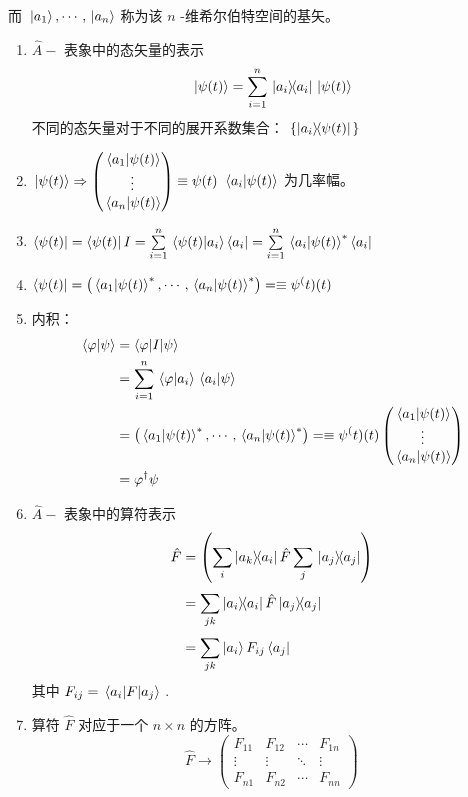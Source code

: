 而 \( \ket*{a_1},\cdots,\ket*{a_n} \) 称为该 \( n \) -维希尔伯特空间的基矢。
\begin{enumerate}
    \item  \( \hat{A}- \) 表象中的态矢量的表示 \[
        \ket*{\psi(t)}=\sum\limits_{i=1}^{n}\ketbra*{a_i}{a_i}\ket*{\psi(t)}
    \] 不同的态矢量对于不同的展开系数集合： \( \left.\{ \ketbra{a_i}{\psi(t)} \right.\} \) 
    \item  \( \ket*{\psi(t)}\Rightarrow\begin{pmatrix}
        \braket*{a_1}{\psi(t)}\\ 
        \vdots \\ 
        \braket*{a_n}{\psi(t)}
    \end{pmatrix}\equiv\psi(t) \)  \( \braket*{a_i}{\psi(t)} \) 为几率幅。
    \item  \( \bra{\psi(t)}=\bra{\psi(t)}I=\sum\limits_{i=1}^{n}\braket*{\psi(t)}{a_i}\bra{a_i}=\sum\limits_{i=1}^{n}\braket*{a_i}{\psi(t)}^*\bra{a_i} \) 
    \item  \( \bra{\psi(t)}=\qty(\braket*{a_1}{\psi(t)}^*,\cdots,\braket*{a_n}{\psi(t)}^*)=\equiv\psi^(t)(t) \) 
    \item 内积： \[\begin{aligned}
        \braket*{\varphi}{\psi}&=\mel**{\varphi}{I}{\psi}\\ 
        &=\sum\limits_{i=1}^{n}\braket*{\varphi}{a_i}\braket*{a_i}{\psi }\\ 
        &= \qty(\braket*{a_1}{\psi(t)}^*,\cdots,\braket*{a_n}{\psi(t)}^*)=\equiv\psi^(t)(t)  \begin{pmatrix}
            \braket*{a_1}{\psi(t)}\\ 
            \vdots \\ 
            \braket*{a_n}{\psi(t)}
        \end{pmatrix}\\ 
        &=\varphi^\dagger\psi 
    \end{aligned}
    \]
    \item  \( \hat{A}- \) 表象中的算符表示 \[
        \begin{aligned}
            \hat{F}&=\qty(\sum\limits_{i}^{}\ketbra{a_k}{a_i}\hat{F}\sum\limits_{j}^{}\ketbra*{a_j}{a_j})  \\ 
            & =\sum\limits_{jk}^{}\ketbra{a_i}{a_i}\hat{F}\ketbra{a_j}{a_j}\\ 
            & =\sum\limits_{jk}^{}\ket{a_i}F_{ij}\bra{a_j}
        \end{aligned}
    \]
    其中 \( F_{ij}=\mel{a_i}{F}{a_j} \) .
    \item 算符 \( \hat{F} \) 对应于一个 \( n\times n \) 的方阵。
    \[
        \hat{F}\longrightarrow\begin{pmatrix}
            F_{11} & F_{12} & \cdots & F_{1n} \\ 
            \vdots & \vdots & \ddots & \vdots \\ 
            F_{n1} & F_{n2} & \cdots & F_{nn} 
        \end{pmatrix}\]
\end{enumerate}


